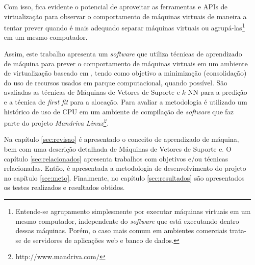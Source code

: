 Com isso, fica evidente o potencial de aproveitar as ferramentas e APIs de
virtualização para observar o comportamento de máquinas virtuais de maneira
a tentar prever quando é mais adequado separar máquinas virtuais ou
agrupá-las\footnote{Entende-se agrupamento simplesmente por
executar máquinas virtuais em um mesmo computador, independente do
\emph{software}
que está executando dentro dessas máquinas. Porém, o caso mais comum em
ambientes comerciais trata-se de servidores de aplicações web e banco de
dados.} em um mesmo computador. 

Assim, este trabalho apresenta um \emph{software} que utiliza técnicas de
aprendizado de máquina para prever o comportamento de máquinas
virtuais em um ambiente de virtualização baseado em \libvirt{}, tendo como
objetivo a minimização (consolidação) do uso de recursos usados em parque
computacional, quando possível. São avaliadas as técnicas de Máquinas de
Vetores de Suporte e $k$-NN para a predição e a técnica de \emph{first fit} para
a alocação. Para avaliar a metodologia é utilizado um histórico de uso de CPU
em um ambiente de compilação de \emph{software} que faz parte do projeto \emph{Mandriva
Linux\footnote{http://www.mandriva.com/}}.

Na capítulo \ref{sec:revisao} é apresentado o conceito de aprendizado de
máquina, bem com uma descrição detalhada de Máquinas de Vetores de Suporte
e. O capítulo \ref{sec:relacionados} apresenta trabalhos com objetivos
e/ou técnicas relacionadas. Então, é apresentada a metodologia de
desenvolvimento do projeto no capítulo \ref{sec:meto}. Finalmente, no
capítulo \ref{sec:resultados} são apresentados os testes realizados e
resultados obtidos.
